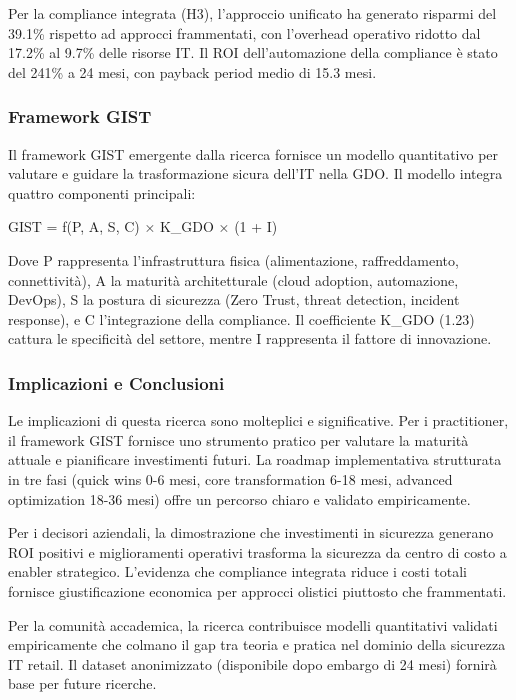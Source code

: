 \documentclass{report}
\begin{document}
Per la compliance integrata (H3), l'approccio unificato ha generato
risparmi del 39.1\% rispetto ad approcci frammentati, con l'overhead
operativo ridotto dal 17.2\% al 9.7\% delle risorse IT. Il ROI
dell'automazione della compliance è stato del 241\% a 24 mesi, con
payback period medio di 15.3 mesi.

\subsubsection{Framework GIST}\label{framework-gist}

Il framework GIST emergente dalla ricerca fornisce un modello
quantitativo per valutare e guidare la trasformazione sicura dell'IT
nella GDO. Il modello integra quattro componenti principali:

GIST = f(P, A, S, C) × K\_GDO × (1 + I)

Dove P rappresenta l'infrastruttura fisica (alimentazione,
raffreddamento, connettività), A la maturità architetturale (cloud
adoption, automazione, DevOps), S la postura di sicurezza (Zero Trust,
threat detection, incident response), e C l'integrazione della
compliance. Il coefficiente K\_GDO (1.23) cattura le specificità del
settore, mentre I rappresenta il fattore di innovazione.

\subsubsection{Implicazioni e
Conclusioni}\label{implicazioni-e-conclusioni}

Le implicazioni di questa ricerca sono molteplici e significative. Per i
practitioner, il framework GIST fornisce uno strumento pratico per
valutare la maturità attuale e pianificare investimenti futuri. La
roadmap implementativa strutturata in tre fasi (quick wins 0-6 mesi,
core transformation 6-18 mesi, advanced optimization 18-36 mesi) offre
un percorso chiaro e validato empiricamente.

Per i decisori aziendali, la dimostrazione che investimenti in sicurezza
generano ROI positivi e miglioramenti operativi trasforma la sicurezza
da centro di costo a enabler strategico. L'evidenza che compliance
integrata riduce i costi totali fornisce giustificazione economica per
approcci olistici piuttosto che frammentati.

Per la comunità accademica, la ricerca contribuisce modelli quantitativi
validati empiricamente che colmano il gap tra teoria e pratica nel
dominio della sicurezza IT retail. Il dataset anonimizzato (disponibile
dopo embargo di 24 mesi) fornirà base per future ricerche.
\end{document}
